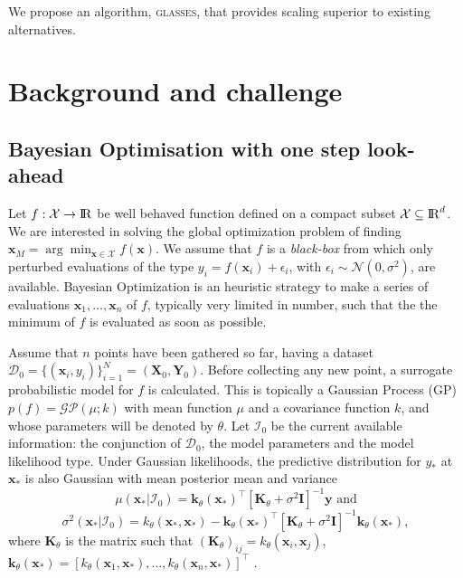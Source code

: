 \documentclass[twoside]{article}
\def\bbbr{{\rm I\!R}}
\newcommand{\I}{\mathcal{I}}
\newcommand{\bx}{\textbf{x}}
\newcommand{\bX}{\textbf{X}}
\newcommand{\bY}{\textbf{Y}}
\newcommand{\by}{\textbf{y}}
\newcommand{\bk}{\textbf{k}}
\newcommand{\bK}{\textbf{K}}
\newcommand{\data}{\mathcal{D}}
\newcommand{\acr}[1]{\textsc{#1}\xspace}
\newcommand{\us}{\acr{glasses}}
\begin{document}
We propose an algorithm, \us, that provides scaling superior to existing alternatives.


\section{Background and challenge}
\subsection{Bayesian Optimisation with one step look-ahead} %
\label{sec:bayesian_optimisation}


Let $f: {\mathcal X} \to \bbbr$ be well behaved function defined on a compact subset ${\mathcal X} \subseteq \bbbr^d$. We are interested in solving the global optimization problem of finding $\bx_{M} = \arg \min_{\bx \in {\mathcal X}} f(\bx)$. We assume that $f$ is a \emph{black-box} from which only perturbed evaluations of the type $y_i = f(\bx_i) + \epsilon_i$, with $\epsilon_i \sim\mathcal{N}(0,\sigma^2)$, are  available. Bayesian Optimization is an heuristic strategy to make a series of evaluations $\bx_1,\dots,\bx_n$ of $f$, typically very limited in number,  such that the the minimum of $f$ is evaluated as soon as possible. \cite{Lizotte_2008}
\cite{Jones_2001}
\cite{Snoek*Larochelle*Adams_2012}
\cite{Brochu*Cora*DeFreitas_2010}

Assume that $n$ points have been gathered so far, having a dataset $\data_0 = \{(\bx_i,y_i)\}_{i=1}^N = (\bX_0,\bY_0)$. Before collecting any new point, a surrogate probabilistic model for $f$ is calculated. This is topically a Gaussian Process (GP) $p(f) = \mathcal{GP}(\mu; k)$ with mean function $\mu$ and a covariance function $k$, and whose parameters will be denoted by $\theta$.  Let $\I_0$ be the current available information: the conjunction of $\data_0$, the model parameters and the model likelihood type.  Under Gaussian likelihoods, the predictive distribution for $y_*$ at $\bx_*$ is also Gaussian with mean posterior mean and variance
$$\mu(\bx_{*}|\I_0) = \bk_{\theta}(\bx_*)^\top[\bK_{\theta} + \sigma^2 \textbf{I}]^{-1}\by \mbox{ and}$$
$$\sigma^2(\bx_*|\I_0)=k_{\theta}(\bx_*,\bx_*)-\bk_{\theta}(\bx_*)^\top[\bK_{\theta}+\sigma^2 \textbf{I}]^{-1}\bk_{\theta}(\bx_*),$$
where $\bK_{\theta}$ is the matrix such that $(\bK_{\theta})_{ij}=k_{\theta}(\bx_i,\bx_j)$,  $\bk_{\theta}(\bx_{*}) = [k_{\theta}(\bx_1,\bx_{*}),\dots,k_{\theta}(\bx_n,\bx_{*})]^\top$ \cite{Rasmussen:2005:GPM:1162254}.  
\end{document}
